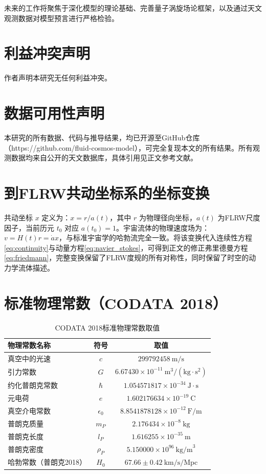 \documentclass[aps,prd,preprint,superscriptaddress,floatfix,numbers,sort&compress]{revtex4-2}
\begin{document}
未来的工作将聚焦于深化模型的理论基础、完善量子涡旋场论框架，以及通过天文观测数据对模型预言进行严格检验。

\section*{利益冲突声明}
作者声明本研究无任何利益冲突。

\section*{数据可用性声明}
本研究的所有数据、代码与推导结果，均已开源至GitHub仓库（https://github.com/fluid-cosmos-model），可完全复现本文的所有结果。所有观测数据均来自公开的天文数据库，具体引用见正文参考文献。

\appendix

\section{到FLRW共动坐标系的坐标变换}
共动坐标 $x$ 定义为：$x=r / a(t)$，其中 $r$ 为物理径向坐标，$a(t)$ 为FLRW尺度因子，当前历元 $t_{0}$ 对应 $a(t_{0})=1$。宇宙流体的物理速度场为：$v=H(t) r=\dot{a} x$，与标准宇宙学的哈勃流完全一致。将该变换代入连续性方程\eqref{eq:continuity}与动量方程\eqref{eq:navier_stokes}，可得到正文的修正弗里德曼方程\eqref{eq:friedmann}，完整变换保留了FLRW度规的所有对称性，同时保留了时空的动力学流体描述。

\section{标准物理常数（CODATA 2018）}
\begin{table}[h]
\centering
\caption{CODATA 2018标准物理常数取值}
\begin{tabular}{lcc}
\hline
物理常数名称 & 符号 & 取值 \\
\hline
真空中的光速 & $c$ & $299792458 \ \text{m/s}$ \\
引力常数 & $G$ & $6.67430 \times 10^{-11} \ \text{m}^3/(\text{kg} \cdot \text{s}^2)$ \\
约化普朗克常数 & $\hbar$ & $1.054571817 \times 10^{-34} \ \text{J} \cdot \text{s}$ \\
元电荷 & $e$ & $1.602176634 \times 10^{-19} \ \text{C}$ \\
真空介电常数 & $\epsilon_0$ & $8.8541878128 \times 10^{-12} \ \text{F/m}$ \\
普朗克质量 & $m_P$ & $2.176434 \times 10^{-8} \ \text{kg}$ \\
普朗克长度 & $l_P$ & $1.616255 \times 10^{-35} \ \text{m}$ \\
普朗克密度 & $\rho_P$ & $5.150000 \times 10^{96} \ \text{kg/m}^3$ \\
哈勃常数（普朗克2018） & $H_0$ & $67.66 \pm 0.42 \ \text{km/s/Mpc}$ \\
\hline
\end{tabular}
\label{tab:physical_constants}
\end{table}
\end{document}
